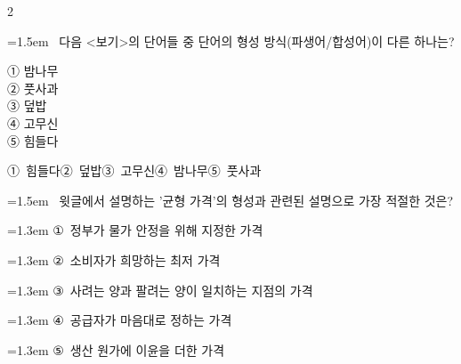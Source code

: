 \documentclass[10pt, a4paper]{article}
\begin{document}
\begin{multicols}{2}
\noindent\begin{minipage}{\columnwidth}
\vspace{2mm}
{\hangindent=1.5em  ~다음 <보기>의 단어들 중 단어의 형성 방식(파생어/합성어)이 다른 하나는?\par}

\vspace{1mm}
\begin{boxibox}
① 밤나무 \\
② 풋사과 \\
③ 덮밥 \\
④ 고무신 \\
⑤ 힘들다 \\
\end{boxibox}
\vspace{1mm}

\vspace{0.5mm}
\noindent
\mbox{①~힘들다}\hspace{1em}\mbox{②~덮밥}\hspace{1em}\mbox{③~고무신}\hspace{1em}\mbox{④~밤나무}\hspace{1em}\mbox{⑤~풋사과}

\vspace{4mm}
\end{minipage}
\par

\noindent\begin{minipage}{\columnwidth}
\vspace{2mm}
{\hangindent=1.5em  ~윗글에서 설명하는 '균형 가격'의 형성과 관련된 설명으로 가장 적절한 것은?\par}

\vspace{0.5mm}
{\hangindent=1.3em  \noindent\hspace{0.3em}①~정부가 물가 안정을 위해 지정한 가격\par}
{\hangindent=1.3em  \noindent\hspace{0.3em}②~소비자가 희망하는 최저 가격\par}
{\hangindent=1.3em  \noindent\hspace{0.3em}③~사려는 양과 팔려는 양이 일치하는 지점의 가격\par}
{\hangindent=1.3em  \noindent\hspace{0.3em}④~공급자가 마음대로 정하는 가격\par}
{\hangindent=1.3em  \noindent\hspace{0.3em}⑤~생산 원가에 이윤을 더한 가격\par}
\vspace{4mm}
\end{minipage}
\par


\end{multicols}
\end{document}
